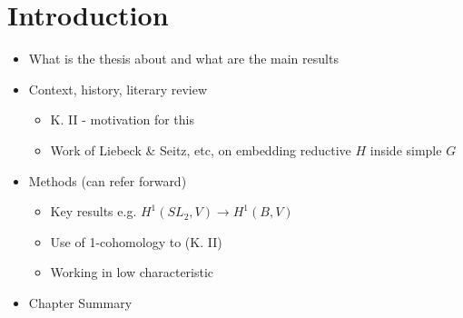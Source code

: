 
\chapter{Introduction}
\label{Chapter1}

\begin{itemize}
\item What is the thesis about and what are the main results
\item Context, history, literary review
\begin{itemize}
	\item K. II - motivation for this
	\item Work of Liebeck \& Seitz, etc, on embedding reductive $H$ inside simple $G$
\end{itemize}
\item Methods (can refer forward)
\begin{itemize}
	\item Key results e.g. $H^1(SL_2, V)\rightarrow H^1(B, V)$
	\item Use of 1-cohomology to (K. II)
	\item Working in low characteristic
\end{itemize}
\item Chapter Summary
\end{itemize}

